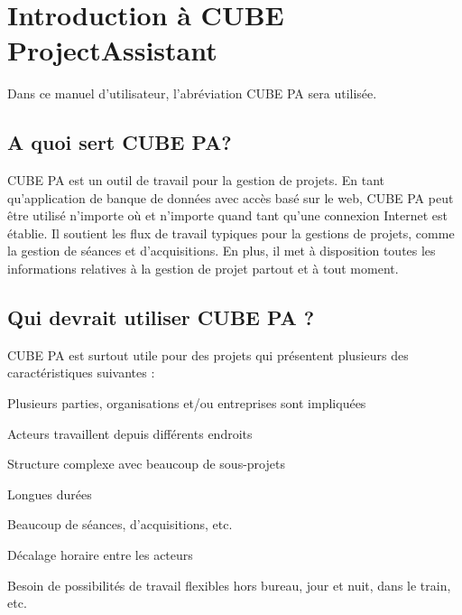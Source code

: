 
\section{Introduction à CUBE ProjectAssistant} %

Dans ce manuel d'utilisateur, l'abréviation CUBE PA sera utilisée.

\subsection{A quoi sert CUBE PA?} %

CUBE PA est un outil de travail pour la gestion de projets. En tant qu'application de banque de données avec accès basé sur le web, CUBE PA peut être utilisé n'importe où et n'importe quand tant qu'une connexion Internet est établie. Il soutient les flux de travail typiques pour la gestions de projets, comme la gestion de séances et d'acquisitions. En plus, il met à disposition toutes les informations relatives à la gestion de projet partout et à tout moment.

\subsection{Qui devrait utiliser CUBE PA ?} %

CUBE PA est surtout utile pour des projets qui présentent plusieurs des caractéristiques suivantes :

	
\begin{compactitem}
	\item Plusieurs parties, organisations et/ou entreprises sont impliquées
	\item Acteurs travaillent depuis différents endroits
	\item Structure complexe avec beaucoup de sous-projets
	\item Longues durées
	\item Beaucoup de séances, d'acquisitions, etc.
	\item Décalage horaire entre les acteurs
	\item Besoin de possibilités de travail flexibles hors bureau, jour et nuit, dans le train, etc.
\end{compactitem}	
		
